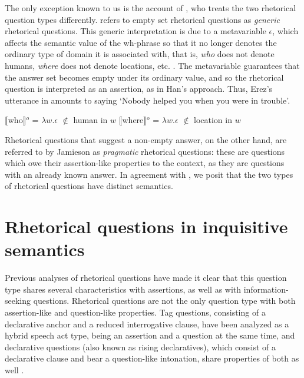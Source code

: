 \documentclass[output=paper,colorlinks,citecolor=brown            ,chinesefont]{langscibook}
\begin{document}
The only exception known to us is the account of \citet{Jamieson2018phd}, who treats the two rhetorical question types differently. \citet{Jamieson2018phd} refers to empty set rhetorical questions as \textit{generic} rhetorical questions. This generic interpretation is due to a metavariable $\epsilon$, which affects the semantic value of the wh-phrase so that it no longer denotes the ordinary type of domain it is associated with, that is, \textit{who} does not denote humans, \textit{where} does not denote locations, etc. . The metavariable guarantees that the answer set becomes empty under its ordinary value, and so the rhetorical question is interpreted as an assertion, as in Han's approach. Thus, Erez's utterance in  amounts to saying `Nobody helped you when you were in trouble'.

\begin{exe}
\ex\label{metavariable} 
\begin{xlist}
\ex\label{metavar1} $\llbracket$who$\rrbracket$$^o$ = $\lambda$$w$.$\epsilon$ $\notin$ human in $w$
\ex\label{metavar3} $\llbracket$where$\rrbracket$$^o$ = $\lambda$$w$.$\epsilon$ $\notin$ location in $w$
\hfill \citep[324]{Jamieson2018phd}
\end{xlist}
\end{exe}

Rhetorical questions that suggest a non-empty answer, on the other hand, are referred to by Jamieson as \textit{pragmatic} rhetorical questions: these are questions which owe their assertion-like properties to the context, as they are questions with an already known answer. In agreement with \citet{Jamieson2018phd}, we posit that the two types of rhetorical questions have distinct semantics.

\section{Rhetorical questions in inquisitive semantics}
\label{sec:inqsem}

Previous analyses of rhetorical questions have made it clear that this question type shares several characteristics with assertions, as well as with information-seeking questions. Rhetorical questions are not the only question type with both assertion-like and question-like properties. Tag questions, consisting of a declarative anchor and a reduced interrogative clause, have been analyzed as a hybrid speech act type, being an assertion and a question at the same time, and declarative questions (also known as rising declaratives), which consist of a declarative clause and bear a question-like intonation, share properties of both as well \citep{Gunlogson2003, Asher+2007, Farkas+2017}. 
\end{document}
